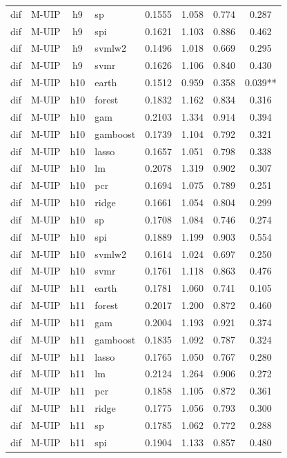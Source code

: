 \begin{ThreePartTable}
\begin{longtable}[t]{llclcccc}
dif & M-UIP & h9 & sp & 0.1555 & 1.058 & 0.774 & 0.287\\
dif & M-UIP & h9 & spi & 0.1621 & 1.103 & 0.886 & 0.462\\
dif & M-UIP & h9 & svmlw2 & 0.1496 & 1.018 & 0.669 & 0.295\\
dif & M-UIP & h9 & svmr & 0.1626 & 1.106 & 0.840 & 0.430\\
\addlinespace
dif & M-UIP & h10 & earth & 0.1512 & 0.959 & 0.358 & 0.039**\\
dif & M-UIP & h10 & forest & 0.1832 & 1.162 & 0.834 & 0.316\\
dif & M-UIP & h10 & gam & 0.2103 & 1.334 & 0.914 & 0.394\\
dif & M-UIP & h10 & gamboost & 0.1739 & 1.104 & 0.792 & 0.321\\
dif & M-UIP & h10 & lasso & 0.1657 & 1.051 & 0.798 & 0.338\\
dif & M-UIP & h10 & lm & 0.2078 & 1.319 & 0.902 & 0.307\\
dif & M-UIP & h10 & pcr & 0.1694 & 1.075 & 0.789 & 0.251\\
dif & M-UIP & h10 & ridge & 0.1661 & 1.054 & 0.804 & 0.299\\
dif & M-UIP & h10 & sp & 0.1708 & 1.084 & 0.746 & 0.274\\
dif & M-UIP & h10 & spi & 0.1889 & 1.199 & 0.903 & 0.554\\
dif & M-UIP & h10 & svmlw2 & 0.1614 & 1.024 & 0.697 & 0.250\\
dif & M-UIP & h10 & svmr & 0.1761 & 1.118 & 0.863 & 0.476\\
\addlinespace
dif & M-UIP & h11 & earth & 0.1781 & 1.060 & 0.741 & 0.105\\
dif & M-UIP & h11 & forest & 0.2017 & 1.200 & 0.872 & 0.460\\
dif & M-UIP & h11 & gam & 0.2004 & 1.193 & 0.921 & 0.374\\
dif & M-UIP & h11 & gamboost & 0.1835 & 1.092 & 0.787 & 0.324\\
dif & M-UIP & h11 & lasso & 0.1765 & 1.050 & 0.767 & 0.280\\
dif & M-UIP & h11 & lm & 0.2124 & 1.264 & 0.906 & 0.272\\
dif & M-UIP & h11 & pcr & 0.1858 & 1.105 & 0.872 & 0.361\\
dif & M-UIP & h11 & ridge & 0.1775 & 1.056 & 0.793 & 0.300\\
dif & M-UIP & h11 & sp & 0.1785 & 1.062 & 0.772 & 0.288\\
dif & M-UIP & h11 & spi & 0.1904 & 1.133 & 0.857 & 0.480\\

\end{longtable}
\end{ThreePartTable}
